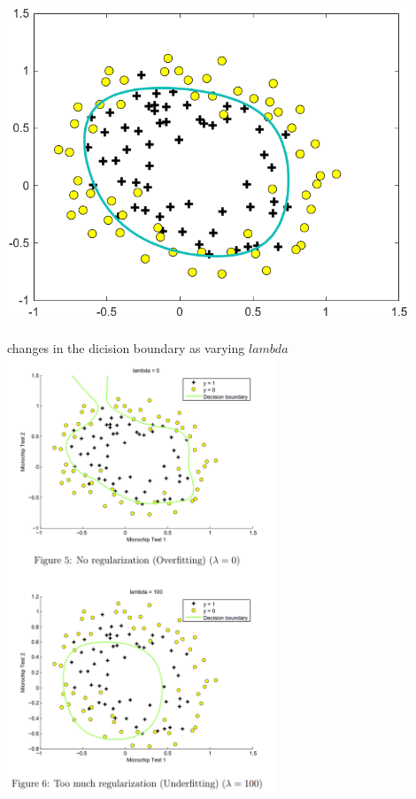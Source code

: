 \documentclass[a4paper, 12pt]{book}
\begin{document}
	\includegraphics[width=12cm]{regression22} \\ \\
	changes in the dicision boundary as varying \(lambda\) \\ 
	\includegraphics[width=8cm]{lambda}
	
	
	
	
	
	
	
	
	
	
	
	
	
	
	
	
	
	
	
	
	
\end{document}
